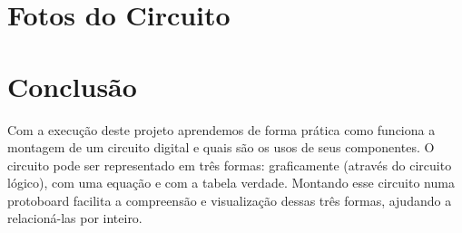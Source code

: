\documentclass[]{article}
\begin{document}
\section{Fotos do Circuito}


\section{Conclusão}
	Com a execução deste projeto aprendemos de forma prática como funciona a montagem de um circuito digital e quais são os usos de seus componentes. O circuito pode ser representado em três formas: graficamente (através do circuito lógico), com uma equação e com a tabela verdade. Montando esse circuito numa protoboard facilita a compreensão e visualização dessas três formas, ajudando a relacioná-las por inteiro.
	
	
\end{document}
